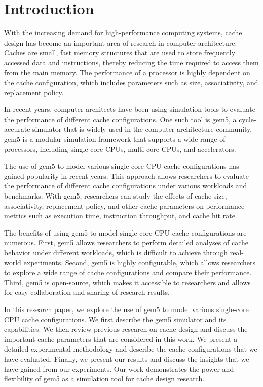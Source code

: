 \documentclass[conference]{IEEEtran}
\begin{document}
\section{Introduction}
With the increasing demand for high-performance computing systems, cache design has become an important area of research in computer architecture. Caches are small, fast memory structures that are used to store frequently accessed data and instructions, thereby reducing the time required to access them from the main memory. The performance of a processor is highly dependent on the cache configuration, which includes parameters such as size, associativity, and replacement policy.

In recent years, computer architects have been using simulation tools to evaluate the performance of different cache configurations. One such tool is gem5, a cycle-accurate simulator that is widely used in the computer architecture community. gem5 is a modular simulation framework that supports a wide range of processors, including single-core CPUs, multi-core CPUs, and accelerators.

The use of gem5 to model various single-core CPU cache configurations has gained popularity in recent years. This approach allows researchers to evaluate the performance of different cache configurations under various workloads and benchmarks. With gem5, researchers can study the effects of cache size, associativity, replacement policy, and other cache parameters on performance metrics such as execution time, instruction throughput, and cache hit rate.

The benefits of using gem5 to model single-core CPU cache configurations are numerous. First, gem5 allows researchers to perform detailed analyses of cache behavior under different workloads, which is difficult to achieve through real-world experiments. Second, gem5 is highly configurable, which allows researchers to explore a wide range of cache configurations and compare their performance. Third, gem5 is open-source, which makes it accessible to researchers and allows for easy collaboration and sharing of research results.

In this research paper, we explore the use of gem5 to model various single-core CPU cache configurations. We first describe the gem5 simulator and its capabilities. We then review previous research on cache design and discuss the important cache parameters that are considered in this work. We present a detailed experimental methodology and describe the cache configurations that we have evaluated. Finally, we present our results and discuss the insights that we have gained from our experiments. Our work demonstrates the power and flexibility of gem5 as a simulation tool for cache design research.
\end{document}

